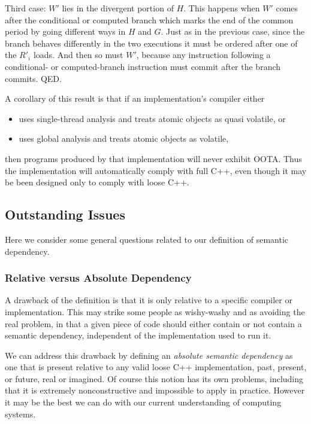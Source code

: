 \documentclass[10]{article}
\begin{document}
Third case: $W'$ lies in the divergent portion of $H$.
This happens when $W'$ comes after the conditional or computed branch
which marks the end of the common period by going different ways in
$H$ and $G$.
Just as in the previous case, since the branch behaves differently in
the two executions it must be ordered after one of the $R'_i$ loads.
And then so must $W'$, because any instruction following a conditional-
or computed-branch instruction must commit after the branch commits.
QED.

\medskip

A corollary of this result is that if an implementation's compiler
either
\begin{itemize}
\item	uses single-thread analysis and treats atomic objects as
	quasi volatile, or
\item	uses global analysis and treats atomic objects as volatile,
\end{itemize}
then programs produced by that implementation will never exhibit OOTA.
Thus the implementation will automatically comply with full C++, even
though it may be been designed only to comply with loose C++.

\subsection{Outstanding Issues}
\label{sec:Outstanding Issues}

Here we consider some general questions related to our definition of
semantic dependency.

\subsubsection{Relative versus Absolute Dependency}
\label{sec:Relative versus Absolute Dependency}

A drawback of the definition is that it is only relative to a specific
compiler or implementation.
This may strike some people as wishy-washy and as avoiding the real
problem, in that a given piece of code should either contain or not
contain a semantic dependency, independent of the implementation used to
run it.

We can address this drawback by defining an \emph{absolute semantic
dependency} as one that is present relative to any valid loose C++
implementation, past, present, or future, real or imagined.
Of course this notion has its own problems, including that it is
extremely nonconstructive and impossible to apply in practice.
However it may be the best we can do with our current understanding
of computing systems.
\end{document}
